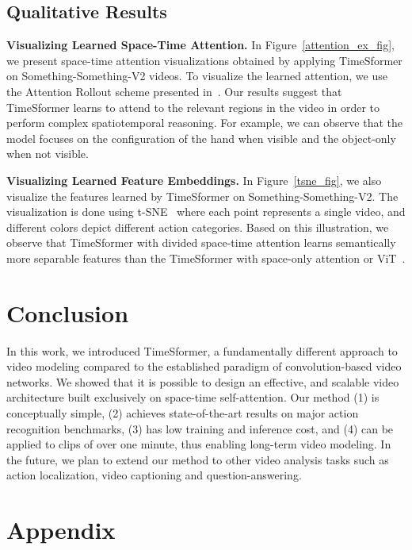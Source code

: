 \documentclass{article}
\begin{document}
\subsection{Qualitative Results}

\textbf{Visualizing Learned Space-Time Attention.} In Figure~\ref{attention_ex_fig}, we present space-time attention visualizations obtained by applying TimeSformer on Something-Something-V2 videos. To visualize the learned attention, we use the Attention Rollout scheme presented in~\cite{abnar2020quantifying}.  Our results suggest that TimeSformer learns to attend to the relevant regions in the video in order to perform complex spatiotemporal reasoning. For example, we can observe that the model focuses on the configuration of the hand when visible and the object-only when not visible. 

\textbf{Visualizing Learned Feature Embeddings.} In Figure~\ref{tsne_fig}, we also visualize the features learned by TimeSformer on Something-Something-V2. The visualization is done using t-SNE~\cite{vanDerMaaten2008} where each point represents a single video, and different colors depict different action categories. Based on this illustration, we observe that TimeSformer with divided space-time attention learns semantically more separable features than the TimeSformer with space-only attention or ViT~\cite{Dosovitskiy:ICLR2021}.


\section{Conclusion}


In this work, we introduced TimeSformer, a fundamentally different approach to video modeling compared to the established paradigm of convolution-based video networks. We showed that it is possible to design an effective, and scalable video architecture built exclusively on space-time self-attention.  Our method (1) is conceptually simple, (2) achieves state-of-the-art results on major action recognition benchmarks, (3) has low training and inference cost, and (4) can be applied to clips of over one minute, thus enabling long-term video modeling. In the future, we plan to extend our method to other video analysis tasks such as action localization, video captioning and question-answering.



 



\appendix
\section*{Appendix}
\end{document}
